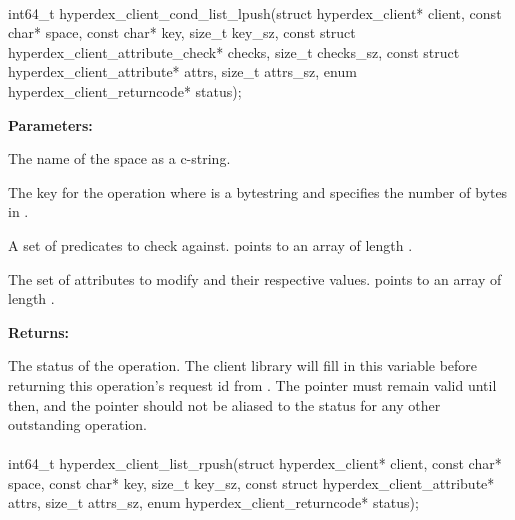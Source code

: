 \paragraph{}
\label{api:c:cond_list_lpush}
\begin{ccode}
int64_t hyperdex_client_cond_list_lpush(struct hyperdex_client* client,
                const char* space,
                const char* key, size_t key_sz,
                const struct hyperdex_client_attribute_check* checks, size_t checks_sz,
                const struct hyperdex_client_attribute* attrs, size_t attrs_sz,
                enum hyperdex_client_returncode* status);
\end{ccode}
\funcdesc 

\noindent\textbf{Parameters:}
\begin{description}[labelindent=\widthof{{\code{checks}, \code{checks\_sz}}},leftmargin=*,noitemsep,nolistsep,align=right]
\item[\code{space}] The name of the space as a c-string.
\item[\code{key}, \code{key\_sz}] The key for the operation where  is a bytestring and  specifies the number of bytes in .
\item[\code{checks}, \code{checks\_sz}] A set of predicates to check against.   points to an array of length .
\item[\code{attrs}, \code{attrs\_sz}] The set of attributes to modify and their respective values.   points to an array of length .
\end{description}

\noindent\textbf{Returns:}
\begin{description}[labelindent=\widthof{{\code{status}}},leftmargin=*,noitemsep,nolistsep,align=right]
\item[\code{status}] The status of the operation.  The client library will fill in this variable before returning this operation's request id from .  The pointer must remain valid until then, and the pointer should not be aliased to the status for any other outstanding operation.
\end{description}

\paragraph{}
\label{api:c:list_rpush}
\begin{ccode}
int64_t hyperdex_client_list_rpush(struct hyperdex_client* client,
                const char* space,
                const char* key, size_t key_sz,
                const struct hyperdex_client_attribute* attrs, size_t attrs_sz,
                enum hyperdex_client_returncode* status);
\end{ccode}
\funcdesc 

